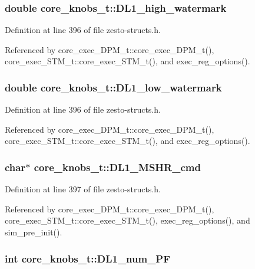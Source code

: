 \subsubsection[{DL1\_\-high\_\-watermark}]{\setlength{\rightskip}{0pt plus 5cm}double {\bf core\_\-knobs\_\-t::DL1\_\-high\_\-watermark}}\label{structcore__knobs__t_2a93ace0d23a13f282dd982945d58f4d}




Definition at line 396 of file zesto-structs.h.

Referenced by core\_\-exec\_\-DPM\_\-t::core\_\-exec\_\-DPM\_\-t(), core\_\-exec\_\-STM\_\-t::core\_\-exec\_\-STM\_\-t(), and exec\_\-reg\_\-options().
\subsubsection[{DL1\_\-low\_\-watermark}]{\setlength{\rightskip}{0pt plus 5cm}double {\bf core\_\-knobs\_\-t::DL1\_\-low\_\-watermark}}\label{structcore__knobs__t_bddaa0dfa1d78c33e2b11ae26acffe7c}




Definition at line 396 of file zesto-structs.h.

Referenced by core\_\-exec\_\-DPM\_\-t::core\_\-exec\_\-DPM\_\-t(), core\_\-exec\_\-STM\_\-t::core\_\-exec\_\-STM\_\-t(), and exec\_\-reg\_\-options().
\subsubsection[{DL1\_\-MSHR\_\-cmd}]{\setlength{\rightskip}{0pt plus 5cm}char$\ast$ {\bf core\_\-knobs\_\-t::DL1\_\-MSHR\_\-cmd}}\label{structcore__knobs__t_c424ee99e6a7cbba14b0ebd96f47b82b}




Definition at line 397 of file zesto-structs.h.

Referenced by core\_\-exec\_\-DPM\_\-t::core\_\-exec\_\-DPM\_\-t(), core\_\-exec\_\-STM\_\-t::core\_\-exec\_\-STM\_\-t(), exec\_\-reg\_\-options(), and sim\_\-pre\_\-init().
\subsubsection[{DL1\_\-num\_\-PF}]{\setlength{\rightskip}{0pt plus 5cm}int {\bf core\_\-knobs\_\-t::DL1\_\-num\_\-PF}}\label{structcore__knobs__t_d2e3e855a3211975e29bcfc575ecc9c1}




